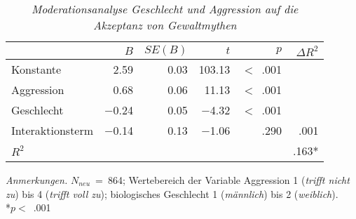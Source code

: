 \begin{table}[htb]
    \caption[Moderationsanalyse Geschlecht und Aggression auf die Akzeptanz von Gewaltmythen]{\textit {Moderationsanalyse Geschlecht und Aggression auf die Akzeptanz von Gewaltmythen}} 
    \label{Moderationsanalyse}
    \centering
    \begin{adjustbox}{width=11cm} %
    \small
    \begin{tabular}{lrrrrr}
      \hline
      & $B$    & $SE(B)$  & $t$    & $p$ & $\Delta R^{2}$\\
      \hline
    Konstante  & 2.59    & 0.03 & 103.13  & $<$~.001 & \\
    Aggression & 0.68    & 0.06 & 11.13   & $<$~.001 & \\
    Geschlecht & $-$0.24 & 0.05 & $-$4.32 & $<$~.001 & \\
    Interaktionsterm & $-$0.14 & 0.13 & $-$1.06 & .290 & .001 \\
    $R^{2}$          &         &      &         &      & .163* \\
       \hline
    \end{tabular}
    \end{adjustbox}
    
    \begin{tablenotes}
        \item \textit{Anmerkungen.} \( N_{neu} \)~=~864; Wertebereich der Variable Aggression 1 (\textit{trifft nicht zu}) bis 4 (\textit{trifft voll zu}); biologisches Geschlecht 1 (\textit{männlich}) bis 2 (\textit{weiblich}).\\ *$p<$~.001
      \end{tablenotes}
    \end{table}



